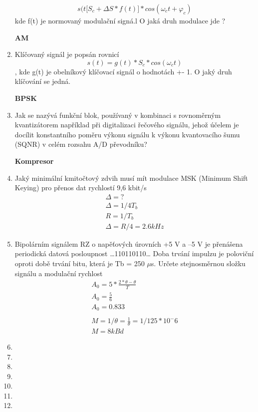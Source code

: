 \begin{enumerate}
     \begin{align*}
s(t\lbrack S_c+\Delta S*f(t)]*cos(\omega_ct+\varphi_c)
     \end{align*} kde f(t) je 
normovaný modulační signá.l O jaká druh modulace jde ?

     \textbf{AM}
    \item Klíčovaný signál je popsán rovnicí
    $$s(t)=g(t)*S_c*cos(\omega_ct)$$, kde g(t) je obelníkový klíčovací signál o hodnotách +- 1. O jaký druh klíčování se jedná.

    \textbf{BPSK}
    \item Jak se nazývá funkční blok, používaný v kombinaci s rovnoměrným kvantizátorem například 
při digitalizaci řečového signálu, jehož účelem je docílit konstantního poměru výkonu signálu 
k výkonu kvantovacího šumu (SQNR) v celém rozsahu A/D převodníku?

\textbf{Kompresor}

    \item Jaký minimální kmitočtový zdvih musí mít modulace MSK (Minimum Shift Keying) pro přenos 
dat rychlostí 9,6 kbit/s
\begin{align*}
    \Delta=? \\
    \Delta=1/4T_b\\
    R=1/T_b \\
    \Delta=R/4=2.6kHz
\end{align*}
    \item Bipolárním signálem RZ o napěťových úrovních +5 V a –5 V je přenášena periodická datová 
posloupnost …110110110… Doba trvání impulzu je poloviční oproti době trvání bitu, která je 
Tb = 250 $\mu$s. Určete stejnosměrnou složku signálu a modulační rychlost
\begin{align*}
    A_0=5*\frac{2*\theta-\theta}{T}\\
     A_0=\frac{5}{6}\\
      A_0=0.833 \\
      \\
      M=1/\theta=\frac{1}{\theta}=1/125*10^-6\\
      M=8kBd
\end{align*}
    \item 
    \item 
    \item 
    \item 
    \item 
    \item 
    \item 

\end{enumerate}
